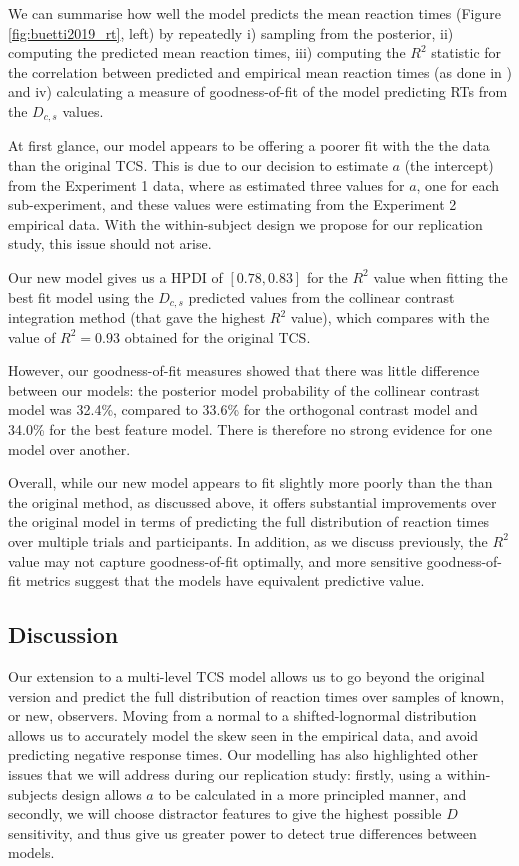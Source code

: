 \documentclass[smallextended, natbib]{svjour3}       %
\begin{document}
We can summarise how well the model predicts the mean reaction times (Figure \ref{fig:buetti2019_rt}, left) by repeatedly i) sampling from the posterior, ii) computing the predicted mean reaction times, iii) computing the $R^2$ statistic for the correlation between predicted and empirical mean reaction times (as done in \citep{buetti2019predicting}) and iv) calculating a measure of goodness-of-fit of the model predicting RTs from the $D_{c,s}$ values.

At first glance, our model appears to be offering a poorer fit with the the data than the original TCS. This is due to our decision to estimate $a$ (the intercept) from the Experiment 1 data, where as \cite{buetti2019predicting} estimated three values for $a$, one for each sub-experiment, and these values were estimating from the Experiment 2 empirical data. With the within-subject design we propose for our replication study, this issue should not arise.

Our new model gives us a HPDI of $[0.78, 0.83]$ for the $R^2$ value when fitting the best fit model using the $D_{c,s}$ predicted values from the collinear contrast integration method (that gave the highest $R^2$ value), which compares with the value of $R^2 = 0.93$ obtained for the original TCS.  

However, our goodness-of-fit measures showed that there was little difference between our models: the posterior model probability of the collinear contrast model was 32.4\%, compared to 33.6\% for the orthogonal contrast model and 34.0\% for the best feature model. There is therefore no strong evidence for one model over another.

Overall, while our new model appears to fit slightly more poorly than the than the original method, as discussed above, it offers substantial improvements over the original model in terms of predicting the full distribution of reaction times over multiple trials and participants. In addition, as we discuss previously, the $R^2$ value may not capture goodness-of-fit optimally, and more sensitive goodness-of-fit metrics suggest that the models have equivalent predictive value.



\subsection{Discussion}

Our extension to a multi-level TCS model allows us to go beyond the original version and predict the full distribution of reaction times over samples of known, or new, observers. Moving from a normal to a shifted-lognormal distribution allows us to accurately model the skew seen in the empirical data, and avoid predicting negative response times. Our modelling has also highlighted other issues that we will address during our replication study: firstly, using a within-subjects design allows $a$ to be calculated in a more principled manner, and secondly, we will choose distractor features to give the highest possible $D$ sensitivity, and thus give us greater power to detect true differences between models.
\end{document}
